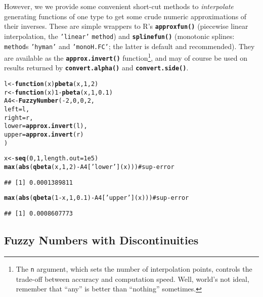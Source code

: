 \documentclass[11pt]{article}\usepackage{graphicx, color}
\makeatletter
\newcommand{\hlfunctioncall}[1]{\textcolor[rgb]{0.501960784313725,0,0.329411764705882}{\textbf{#1}}}%
\newcommand{\hlstring}[1]{\textcolor[rgb]{0.6,0.6,1}{#1}}%
\newcommand{\hlargument}[1]{\textcolor[rgb]{0.690196078431373,0.250980392156863,0.0196078431372549}{#1}}%
\newcommand{\hlcomment}[1]{\textcolor[rgb]{0.180392156862745,0.6,0.341176470588235}{#1}}%
\newenvironment{kframe}{%
 \def\at@end@of@kframe{}%
 \ifinner\ifhmode%
  \def\at@end@of@kframe{\end{minipage}}%
  \begin{minipage}{\columnwidth}%
 \fi\fi%
 \def\FrameCommand##1{\hskip\@totalleftmargin \hskip-\fboxsep
 \colorbox{shadecolor}{##1}\hskip-\fboxsep
     \hskip-\linewidth \hskip-\@totalleftmargin \hskip\columnwidth}%
 \MakeFramed {\advance\hsize-\width
   \@totalleftmargin\z@ \linewidth\hsize
   \@setminipage}}%
 {\par\unskip\endMakeFramed%
 \at@end@of@kframe}
\newenvironment{knitrout}{}{} %
\newcommand{\lang}[1]{\textsf{#1}\xspace}
\newcommand{\R}{\lang{R}}
\newcommand{\func}[1]{\texttt{\hlfunctioncall{#1}}}
\newcommand{\argument}[1]{\texttt{\hlargument{#1}}}
\newcommand{\str}[1]{\texttt{\hlstring{#1}}}
\makeatother
\begin{document}
However, we we provide some convenient short-cut methods
to \textit{interpolate} generating functions of one type
to get some crude numeric approximations of their inverses.
These are simple wrappers to \R's \func{approxfun()}
(piecewise linear interpolation,
the \str{'{}linear'{}} \argument{method})
and \func{splinefun()} (monotonic
splines: \argument{method}s \str{'{}hyman{}'}
and \str{'{}monoH.FC'{}}; the latter is
default and recommended).
They are available as the \func{approx.invert()}
function\footnote{The
\argument{n} argument, which sets the number of interpolation points,
controls the trade-off between accuracy and computation speed.
Well, world's not ideal, remember that ``any'' is better than ``nothing''
sometimes.}, and may
of course be used on results returned by
\func{convert.alpha()}
and \func{convert.side()}.


\begin{knitrout}\small
{}\color{fgcolor}\begin{kframe}
\begin{alltt}
l <- \hlfunctioncall{function}(x) \hlfunctioncall{pbeta}(x, 1, 2)
r <- \hlfunctioncall{function}(x) 1-\hlfunctioncall{pbeta}(x, 1, 0.1)
A4 <- \hlfunctioncall{FuzzyNumber}(-2, 0, 0, 2,
   left  = l,
   right = r,
   lower = \hlfunctioncall{approx.invert}(l),
   upper = \hlfunctioncall{approx.invert}(r)
)

x <- \hlfunctioncall{seq}(0,1,length.out=1e5)
\hlfunctioncall{max}(\hlfunctioncall{abs}(\hlfunctioncall{qbeta}(x, 1, 2) - A4[\hlstring{'lower'}](x)))     \hlcomment{# sup-error}
\end{alltt}
\begin{verbatim}
## [1] 0.0001389811
\end{verbatim}
\begin{alltt}
\hlfunctioncall{max}(\hlfunctioncall{abs}(\hlfunctioncall{qbeta}(1-x, 1, 0.1) - A4[\hlstring{'upper'}](x))) \hlcomment{# sup-error}
\end{alltt}
\begin{verbatim}
## [1] 0.0008607773
\end{verbatim}
\end{kframe}
\end{knitrout}


\subsection{Fuzzy Numbers with Discontinuities}\label{Sec:discontdef}
\end{document}
